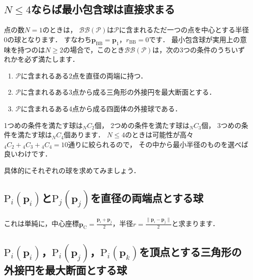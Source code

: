 ﻿\documentclass[a4paper]{jsarticle}
\begin{document}
\subsection{$N\leq 4$ならば最小包含球は直接求まる}

点の数$N=1$のときは，
$\mathcal{BB}(\mathcal{P})$は$\mathcal{P}$に含まれるただ一つの点を中心とする半径$0$の球となります．
すなわち$\boldsymbol{p}_{\mathrm{BB}}=\boldsymbol{p}_{1}$，$r_{\mathrm{BB}}=0$です．
最小包含球が実用上の意味を持つのは$N\geq 2$の場合で，このとき$\mathcal{BB}(\mathcal{P})$は，次の3つの条件のうちいずれかを必ず満たします．
\begin{enumerate}
\item{$\mathcal{P}$に含まれるある2点を直径の両端に持つ．}
\item{$\mathcal{P}$に含まれるある3点から成る三角形の外接円を最大断面とする．}
\item{$\mathcal{P}$に含まれるある4点から成る四面体の外接球である．}
\end{enumerate}

1つめの条件を満たす球は${}_{N}C_{2}$個，
2つめの条件を満たす球は${}_{N}C_{3}$個，
3つめの条件を満たす球は${}_{N}C_{4}$個あります．
$N\leq 4$のときは可能性が高々${}_{4}C_{2}+{}_{4}C_{3}+{}_{4}C_{4}=10$通りに絞られるので，
その中から最小半径のものを選べば良いわけです．

具体的にそれぞれの球を求めてみましょう．

\subsection{$\mathrm{P}_{i}(\boldsymbol{p}_{i})$と$\mathrm{P}_{j}(\boldsymbol{p}_{j})$を直径の両端点とする球}

これは単純に，中心座標$\boldsymbol{p}_{\mathrm{C}}=\frac{\displaystyle\boldsymbol{p}_{i}+\boldsymbol{p}_{j}}{\displaystyle 2}$，半径$r=\frac{\displaystyle \|\boldsymbol{p}_{i}-\boldsymbol{p}_{j}\|}{\displaystyle 2}$と求まります．

\subsection{$\mathrm{P}_{i}(\boldsymbol{p}_{i})$，$\mathrm{P}_{i}(\boldsymbol{p}_{j})$，$\mathrm{P}_{i}(\boldsymbol{p}_{k})$を頂点とする三角形の外接円を最大断面とする球}

\begin{figure*}[h]
\centering

\end{figure*}
\end{document}
